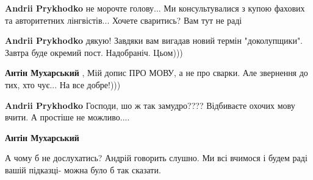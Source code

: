 \begin{itemize}
\begin{itemize}
 
\textbf{Andrii Prykhodko} 
не морочте голову... Ми консультувалися з купою фахових та авторитетних
лінгвістів... Хочете сваритись? Вам тут не раді

 
\textbf{Andrii Prykhodko} дякую! Завдяки вам вигадав новий термін "доколупщики". Завтра буде окремий пост. Надобраніч. Цьом)))

 
\textbf{Антін Мухарський} ,
Мій допис
ПРО МОВУ,
а не про сварки.
Але звернення до тих,
хто чує...
На все добре!)))

 
\textbf{Andrii Prykhodko} Господи, шо ж так замудро???? Відбиваєте охочих мову вчити. А простіше не можливо....

 
\textbf{Антін Мухарський} 

А чому б не дослухатись? Андрій говорить слушно. Ми всі вчимося і будем раді
вашій підказці- можна було б так сказати.

 

\end{itemize}
\end{itemize}
